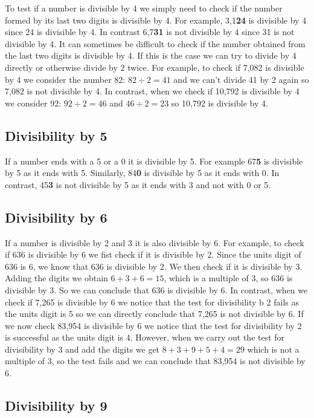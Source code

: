 \documentclass[11pt, oneside]{article}
\theoremstyle{definition}
\begin{document}
To test if a number is divisible by 4 we simply need to check if the number formed by its last two digits is divisible by 4. For example, 3,1{\bf24} is divisible by 4 since 24 is divisible by 4. In contrast 6,7{\bf31} is not divisible by 4 since 31 is not divisible by 4. It can sometimes be difficult to check if the number obtained from the last two digits is divisible by 4. If this is the case we can try to divide by 4 directly or otherwise divide by 2 twice. For example, to check if 7,082 is divisible by 4 we consider the number 82: $82\div 2 = 41$ and we can't divide 41 by 2 again so 7,082 is not divisible by 4. In contrast, when we check if 10,792 is divisible by 4 we consider 92: $92\div 2 = 46$ and $46 \div 2 = 23$ so 10,792 is divisible by 4.

\subsection{Divisibility by 5}

If a number ends with a 5 or a 0 it is divisible by 5. For example 67{\bf5} is divisible by 5 as it ends with 5. Similarly, 84{\bf0} is divisible by 5 as it ends with 0. In contrast, 45{\bf3} is not divisible by 5 as it ends with 3 and not with 0 or 5.

\subsection{Divisibility by 6}

If a number is divisible by 2 and 3 it is also divisible by 6. For example, to check if 636 is divisible by 6 we fist check if it is divisible by 2. Since the units digit of 636 is 6, we know that 636 is divisible by 2. We then check if it is divisible by 3. Adding the digits we obtain $6 + 3 + 6 = 15$, which is a multiple of 3, so 636 is divisible by 3. So we can conclude that 636 is divisible by 6. In contrast, when we check if 7,265 is divisible by 6 we notice that the test for divisibility b 2 fails as the units digit is 5 so we can directly conclude that 7,265 is not divisible by 6. If we now check 83,954 is divisible by 6 we notice that the test for divisibility by 2 is successful as the units digit is 4. However, when we carry out the test for divisibility by 3 and add the digits we get $8 + 3 + 9 + 5 + 4 = 29$ which is not a multiple of 3, so the test fails and we can conclude that 83,954 is not divisible by 6.

\subsection{Divisibility by 9}
\end{document}
